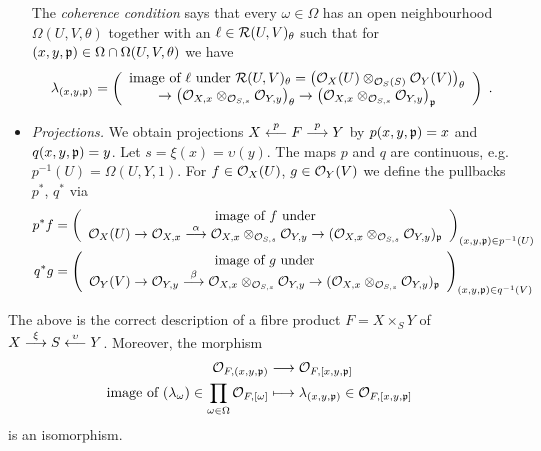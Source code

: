 \documentclass[a4paper,parskip=half,numbers=enddot, DIV=12]{scrreprt}
\begin{document}
\begin{itemize}
	The \emph{coherence condition} says that every $\omega\in\Omega$ has an open neighbourhood $\Omega(U,V,\theta)$ together with an $\ell\in\mathcal{R}(U,V)_{\theta}$ such that for $(x,y,\mathfrak{p})\in\Omega\cap\Omega(U,V,\theta)$ we have
	\begin{align*}
		\lambda_{(x,y,\pp)}=\left(
		\begin{array}{c}
			\text{image of }\ell\text{ under }\Rr(U,V)_\theta=\left(\Oo_X(U)\otimes_{\Oo_S(S)}\Oo_Y(V)\right)_\theta\\
			\morphism\left(\Oo_{X,x}\otimes_{\Oo_{S,s}}\Oo_{Y,y}\right)_\theta\morphism\left(\Oo_{X,x}\otimes_{\Oo_{S,s}}\Oo_{Y,y}\right)_\pp
		\end{array}\right)\;.
	\end{align*}
	\item \emph{Projections.} We obtain projections $X\lmorphism[p]F\morphism[p] Y$ by $p(x,y,\mathfrak{p}) = x$ and $q(x,y,\mathfrak{p}) = y$. Let $s=\xi(x)=\upsilon(y)$. The maps $p$ and $q$ are continuous, e.g. $p^{-1}(U)=\Omega(U,Y,1)$. For $f\in\mathcal{O}_X(U)$, $g\in \mathcal{O}_Y(V)$ we define the pullbacks $p^*$, $q^*$ via
	\begin{align*}
        p^*f&= \left(
        \begin{array}{c}
	        \text{image of } f\text{ under}\\
	         \Oo_X(U) \morphism\Oo_{X,x} \morphism[\alpha] \Oo_{X,x}\otimes_{\Oo_{S,s}}\Oo_{Y,y} \morphism (\Oo_{X,x}\otimes_{\Oo_{S,s}}\Oo_{Y,y})_\pp
        \end{array}\right)_{(x,y,\pp) \in p^{-1}(U)}\\
        q^*g&=  \left(
        \begin{array}{c}
	        \text{image of } g\text{ under}\\
	         \Oo_Y(V) \morphism\Oo_{Y,y} \morphism[\beta] \Oo_{X,x}\otimes_{\Oo_{S,s}}\Oo_{Y,y} \morphism (\Oo_{X,x}\otimes_{\Oo_{S,s}}\Oo_{Y,y})_\pp
	         \end{array}\right)_{(x,y,\pp) \in q^{-1}(V)}
	\end{align*}
\end{itemize}
\begin{prop}
    The above is the correct description of a fibre product $F=X\times_SY$ of $X\morphism[\xi]S\lmorphism[\upsilon]Y$. Moreover, the morphism
    \begin{align*}
        \Oo_{F,(x,y,\pp)} &\morphism \Oo_{F,[x,y,\pp]}\\
        \text{image of }(\lambda_\omega)\in\prod_{\omega\in\Omega}\Oo_{F,[\omega]}&\longmapsto\lambda_{(x,y,\pp)}\in\Oo_{F,[x,y,\pp]}
    \end{align*}
    is an isomorphism.
\end{prop}
\end{document}
